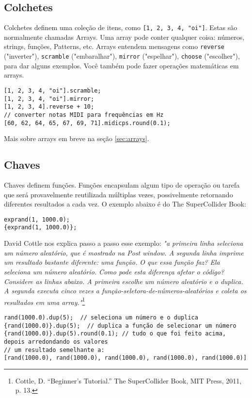 \subsection{Colchetes}

Colchetes definem uma coleção de itens, como \texttt{[1, 2, 3, 4, "oi"]}. Estas são normalmente chamadas Arrays. Uma array pode conter qualquer coisa: números, strings, funções, Patterns, etc. Arrays entendem mensagens como \texttt{reverse} ("inverter"), \texttt{scramble} ("embaralhar"), \texttt{mirror} ("espelhar"), \texttt{choose} ("escolher"), para dar alguns exemplos. Você também pode fazer operações matemáticas em arrays.


\begin{lstlisting}[style=SuperCollider-IDE, basicstyle=\scttfamily\footnotesize]
[1, 2, 3, 4, "oi"].scramble;
[1, 2, 3, 4, "oi"].mirror;
[1, 2, 3, 4].reverse + 10;
// converter notas MIDI para frequências em Hz 
[60, 62, 64, 65, 67, 69, 71].midicps.round(0.1);
\end{lstlisting}

Mais sobre arrays em breve na seção \ref{sec:arrays}.

\subsection{Chaves}

Chaves definem funções. Funções encapsulam algum tipo de operação ou tarefa que será provavelmente reutilizada múltiplas vezes, possivelmente retornando diferentes resultados a cada vez. O exemplo abaixo é do The SuperCollider Book:

\begin{lstlisting}[style=SuperCollider-IDE, basicstyle=\scttfamily\footnotesize]
exprand(1, 1000.0);
{exprand(1, 1000.0)};
\end{lstlisting}

David Cottle nos explica passo a passo esse exemplo: \textit{"a primeira linha seleciona um número aleatório, que é mostrado na Post window. A segunda linha imprime um resultado bastante diferente: uma função. O que essa função faz? Ela seleciona um número aleatório. Como pode esta diferença afetar o código? Considere as linhas abaixo. A primeira escolhe um número aleatório e o duplica. A segunda executa  cinco vezes a função-seletora-de-números-aleatórios e coleta os resultados em uma array."}\footnote{Cottle, D. ``Beginner's Tutorial.'' The SuperCollider Book, MIT Press, 2011, p. 13.}

\begin{lstlisting}[style=SuperCollider-IDE, basicstyle=\scttfamily\footnotesize]
rand(1000.0).dup(5);  // seleciona um número e o duplica
{rand(1000.0)}.dup(5);  // duplica a função de selecionar um número 
{rand(1000.0)}.dup(5).round(0.1); // tudo o que foi feito acima, depois arredondando os valores
// um resultado semelhante a:
[rand(1000.0), rand(1000.0), rand(1000.0), rand(1000.0), rand(1000.0)]
\end{lstlisting}
 
